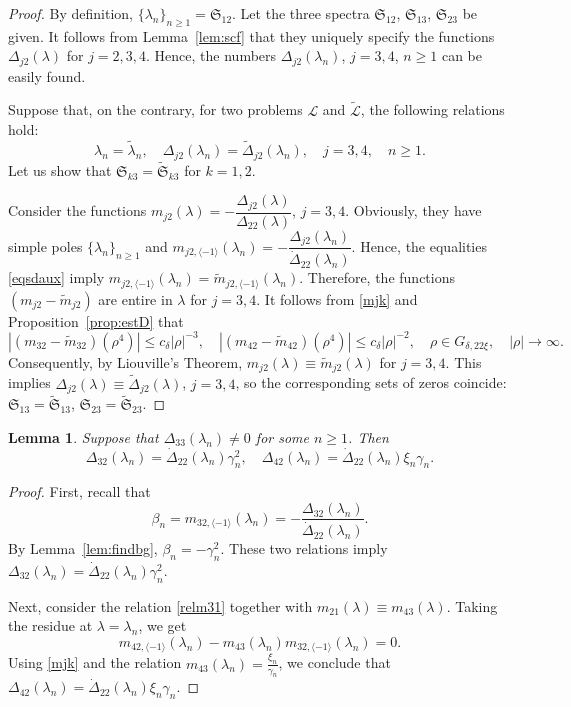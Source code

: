 \documentclass[a4paper,12pt]{article}
\newcommand{\be}{\beta}
\newcommand{\ga}{\gamma}
\newcommand{\de}{\delta}
\newcommand{\la}{\lambda}
\theoremstyle{plain}
\numberwithin{equation}{section}
\newtheorem{lem}[thm]{Lemma}
\theoremstyle{definition}
\theoremstyle{remark}
\begin{document}
\begin{proof}
By definition, $\{ \la_n \}_{n \ge 1} = \mathfrak S_{12}$. Let the three spectra $\mathfrak S_{12}$, $\mathfrak S_{13}$, $\mathfrak S_{23}$ be given. It follows from Lemma~\ref{lem:scf} that they uniquely specify the functions $\Delta_{j2}(\la)$ for $j = 2, 3, 4$. Hence, the numbers $\Delta_{j2}(\la_n)$, $j = 3, 4$, $n \ge 1$ can be easily found.

Suppose that, on the contrary, for two problems $\mathcal L$ and $\tilde{\mathcal L}$, the following relations hold: 
\begin{equation} \label{eqsdaux}
\la_n = \tilde \la_n, \quad \Delta_{j2}(\la_n) = \tilde \Delta_{j2}(\la_n), \quad j = 3, 4, \quad n \ge 1.
\end{equation}
Let us show that $\mathfrak S_{k3} = \tilde{\mathfrak S}_{k3}$ for $k = 1, 2$.

Consider the functions $m_{j2}(\la) = -\dfrac{\Delta_{j2}(\la)}{\Delta_{22}(\la)}$, $j = 3, 4$. Obviously, they have simple poles $\{ \la_n \}_{n \ge 1}$ and $m_{j2,\langle -1 \rangle}(\la_n) = -\dfrac{\Delta_{j2}(\la_n)}{\dot \Delta_{22}(\la_n)}$. Hence, the equalities \eqref{eqsdaux} imply $m_{j2,\langle -1 \rangle}(\la_n) = \tilde m_{j2,\langle -1 \rangle}(\la_n)$. Therefore, the functions $(m_{j2} - \tilde m_{j2})$ are entire in $\la$ for $j = 3, 4$. It follows from \eqref{mjk} and Proposition~\ref{prop:estD} that
$$
|(m_{32} - \tilde m_{32})(\rho^4)| \le c_{\de} |\rho|^{-3}, \quad
|(m_{42} - \tilde m_{42})(\rho^4)| \le c_{\de} |\rho|^{-2}, \quad \rho \in G_{\de, 22\xi}, \quad |\rho| \to \infty.
$$
Consequently, by Liouville's Theorem, $m_{j2}(\la) \equiv \tilde m_{j2}(\la)$ for $j=3,4$. This implies $\Delta_{j2}(\la) \equiv \tilde \Delta_{j2}(\la)$, $j = 3, 4$, so the corresponding sets of zeros coincide: $\mathfrak S_{13} = \tilde{\mathfrak S}_{13}$, $\mathfrak S_{23} = \tilde{\mathfrak S}_{23}$.
\end{proof}

\begin{lem} \label{lem:relBM}
Suppose that $\Delta_{33}(\la_n) \ne 0$ for some $n \ge 1$. Then
\begin{equation} \label{relBM}
\Delta_{32}(\la_n) = \dot \Delta_{22}(\la_n) \ga_n^2, \quad
\Delta_{42}(\la_n) = \dot \Delta_{22}(\la_n) \xi_n \ga_n.
\end{equation}
\end{lem}

\begin{proof}
First, recall that 
$$
\be_n = m_{32,\langle -1 \rangle}(\la_n) = -\frac{\Delta_{32}(\la_n)}{\dot \Delta_{22}(\la_n)}.
$$
By Lemma~\ref{lem:findbg}, $\be_n = -\ga_n^2$. These two relations imply $\Delta_{32}(\la_n) = \dot \Delta_{22}(\la_n) \ga_n^2$.

Next, consider the relation \eqref{relm31} together with $m_{21}(\la) \equiv m_{43}(\la)$. Taking the residue at $\la = \la_n$, we get
$$
m_{42,\langle -1 \rangle}(\la_n) - m_{43}(\la_n) m_{32,\langle -1 \rangle}(\la_n) = 0.
$$
Using \eqref{mjk} and the relation $m_{43}(\la_n) = \frac{\xi_n}{\ga_n}$, we conclude that $\Delta_{42}(\la_n) = \dot \Delta_{22}(\la_n) \xi_n \ga_n$.
\end{proof}
\end{document}
